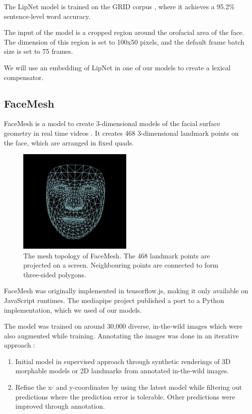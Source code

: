 The LipNet model is trained on the GRID corpus \cite{cooke2006grid}, where it achieves a 95.2\% sentence-level word accuracy.

The input of the model is a cropped region around the orofacial area of the face. The dimension of this region is set to 100x50 pixels, and the default frame batch size is set to 75 frames.

We will use an embedding of LipNet in one of our models to create a lexical compensator.

\subsection{FaceMesh}


FaceMesh is a model to create 3-dimensional models of the facial surface geometry in real time videos \cite{kartynnik2019facemesh}. It creates 468 3-dimensional landmark points on the face, which are arranged in fixed quads.

\begin{figure}
    \centering
    \includegraphics[width=0.5\textwidth]{res/facemesh2.png}
    \caption{The mesh topology of FaceMesh. The 468 landmark points are projected on a screen. Neighbouring points are connected to form three-sided polygons.}
    \label{fig:facemesh}
\end{figure}

FaceMesh was originally implemented in tensorflow.js, making it only available on JavaScript runtimes. The mediapipe project published a port to a Python implementation, which we used of our models.

The model was trained on around 30,000 diverse, in-the-wild images which were also augmented while training. Annotating the images was done in an iterative approach \cite{kartynnik2019facemesh}:
\begin{enumerate}
    \item Initial model in supervised approach through synthetic renderings of 3D morphable models or 2D landmarks from annotated in-the-wild images.
    \item Refine the x- and y-coordinates by using the latest model while filtering out predictions where the prediction error is tolerable. Other predictions were improved through annotation.
\end{enumerate}
